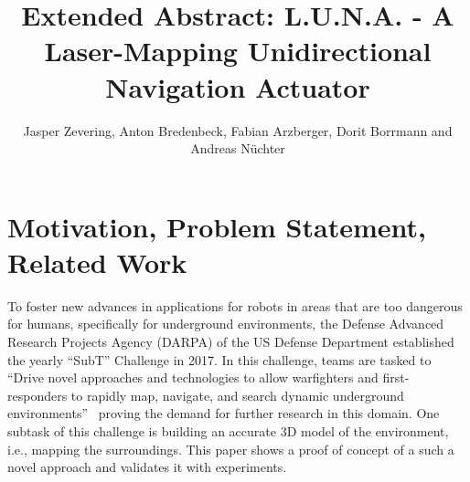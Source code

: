 \documentclass[graybox]{svmult}
\newcommand{\1}{\mathbbm{1}}                 %
\begin{document}
\title*{Extended Abstract:           L.U.N.A. - A Laser-Mapping Unidirectional Navigation Actuator} 
\author{Jasper Zevering, Anton Bredenbeck, Fabian Arzberger,
  Dorit Borrmann and Andreas N\"uchter}


%
%
\maketitle


\renewcommand{\floatpagefraction}{.9} 

\section{Motivation, Problem Statement, Related Work}

To foster new advances in applications for robots in areas that are too dangerous for humans, specifically for underground environments, the  Defense Advanced Research Projects Agency (DARPA) of the US Defense Department established the yearly ``SubT'' Challenge in 2017.
In this challenge, teams are tasked to ``Drive novel approaches and technologies to allow warfighters and first-responders to rapidly map, navigate, and search dynamic underground environments''~\cite{allen} proving the demand for further research in this domain.
One subtask of this challenge is building an accurate 3D model of the environment, i.e., mapping the surroundings. 
This paper shows a proof of concept of a such a novel approach and validates it with experiments.
\end{document}
